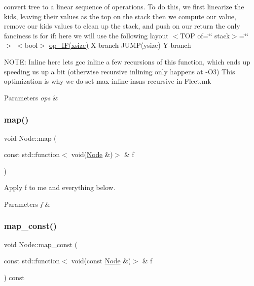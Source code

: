 convert tree to a linear sequence of operations. To do this, we first linearize the kids, leaving their values as the top on the stack then we compute our value, remove our kids\textquotesingle{} values to clean up the stack, and push on our return the only fanciness is for if\+: here we will use the following layout $<$\+T\+O\+P of=\char`\"{}\char`\"{} stack$>$=\char`\"{}\char`\"{}$>$ $<$bool$>$ \hyperlink{_instruction_8h_af2fb7c87c5854c5733d7bb0506b06de7a8f69a9fe993189d72cf7b07e8517801d}{op\+\_\+\+I\+F(xsize)} X-\/branch J\+U\+M\+P(ysize) Y-\/branch

N\+O\+TE\+: Inline here lets gcc inline a few recursions of this function, which ends up speeding us up a bit (otherwise recursive inlining only happens at -\/\+O3) This optimization is why we do set max-\/inline-\/insns-\/recursive in Fleet.\+mk 
\begin{DoxyParams}{Parameters}
{\em ops} & \\
\hline
\end{DoxyParams}
\mbox{\label{class_node_adefac3cb7b411321c5af15dad1484834}} 
\subsubsection{\texorpdfstring{map()}{map()}}
{\footnotesize\ttfamily void Node\+::map (\begin{DoxyParamCaption}\item[{const std\+::function$<$ void(\hyperlink{class_node}{Node} \&)$>$ \&}]{f }\end{DoxyParamCaption})\hspace{0.3cm}{\ttfamily [inline]}}

Apply f to me and everything below. 
\begin{DoxyParams}{Parameters}
{\em f} & \\
\hline
\end{DoxyParams}
\mbox{\label{class_node_a4337bb93da78e142c6171fd81acab93c}} 
\subsubsection{\texorpdfstring{map\+\_\+const()}{map\_const()}}
{\footnotesize\ttfamily void Node\+::map\+\_\+const (\begin{DoxyParamCaption}\item[{const std\+::function$<$ void(const \hyperlink{class_node}{Node} \&)$>$ \&}]{f }\end{DoxyParamCaption}) const\hspace{0.3cm}{\ttfamily [inline]}}

